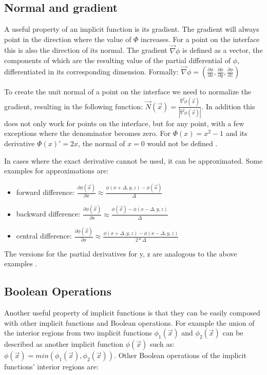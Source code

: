 \subsection{Normal and gradient}

A useful property of an implicit function is its gradient. The gradient will always point in the direction where the value of $\Phi$ increases. For a point on the interface this is also the direction of its normal. The gradient $\vec{\nabla}\phi$ is defined as a vector, the components of which are the resulting value of the partial differential of $\phi$, differentiated in its corresponding dimension\cite{osher:2006:level}. Formally: $\vec{\nabla}\phi = (\frac{\partial\phi}{\partial x},\frac{\partial\phi}{\partial y},\frac{\partial\phi}{\partial z})$ 

To create the unit normal of a point on the interface we need to normalize the gradient, resulting in the following function: $\vec{N}(\vec{x}) = \frac{\vec{\nabla}\phi(\vec{x})}{|\vec{\nabla}\phi(\vec{x})|}$. In addition this does not only work for points on the interface, but for any point, with a few exceptions where the denominator becomes zero. For $\Phi(x) = x^2 - 1$ and its derivative $\Phi(x)' = 2x$, the normal of $x = 0$ would not be defined \cite{osher:2006:level}.

In cases where the exact derivative cannot be used, it can be approximated. Some examples for approximations are:
\begin{itemize}
	\item forward difference:  $\frac{\partial\phi(\vec{x})}{\partial x} \approx \frac{\phi(x+\Delta, y, z) - \phi(\vec{x})}{\Delta}$
	\item backward difference: $\frac{\partial\phi(\vec{x})}{\partial x} \approx \frac{\phi(\vec{x}) - \phi(x-\Delta, y, z)}{\Delta}$
	\item central difference: $\frac{\partial\phi(\vec{x})}{\partial x} \approx \frac{\phi(x+\Delta, y, z) - \phi(x-\Delta, y, z)}{2*\Delta}$
\end{itemize}

The versions for the partial derivatives for y, z are analogous to the above examples \cite{osher:2006:level}.


\subsection{Boolean Operations}
\label{section:boolean}
Another useful property of implicit functions is that they can be easily composed with other implicit functions and Boolean operations. For example the union of the interior regions from two implicit functions $\phi_1(\vec{x})$ and $\phi_2(\vec{x})$ can be described as another implicit function $\phi(\vec{x})$ such as: $\phi(\vec{x}) = min(\phi_1(\vec{x}), \phi_2(\vec{x}))$. Other Boolean operations of the implicit functions' interior regions are:
 
